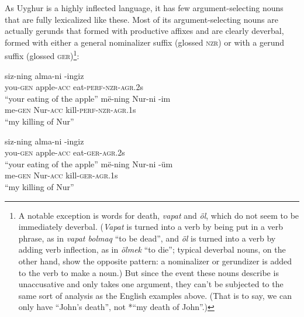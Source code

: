 \documentclass[letterpaper,12pt]{article}
\newcommand{\poss}[2]{\textsc{agr}.{\footnotesize #1}#2}
\newcommand{\gen}{\textsc{gen}}
\begin{document}
As Uyghur is a highly inflected language, it has few argument-selecting nouns that are fully lexicalized like these. Most of its argument-selecting nouns
are actually gerunds that formed with productive affixes and are clearly deverbal, formed with either a general nominalizer suffix (glossed \textsc{nzr}) or with a 
gerund suffix (glossed \textsc{ger})\footnote{A notable exception is words for death, \textsl{vapat} and \textsl{\"ol}, which do not seem to be
immediately deverbal. (\textsl{Vapat} is turned into a verb by being put in a verb phrase, as in \textsl{vapat bolmaq} ``to be dead'', and \textsl{\"ol} is turned into a
verb by adding verb inflection, as in \textsl{\"olmek} ``to die''; typical deverbal nouns, on the other hand, show the opposite pattern: a nominalizer or gerundizer is added
to the verb to make a noun.) But since the event these nouns describe is unaccusative and only takes one argument, they can't be subjected to the same sort of analysis as the
English examples above. (That is to say, we can only have ``John's death'', not *``my death of John''.)}:
\begin{exe}
\ex
	\begin{xlist}
	\ex \gll siz-ning alma-ni -ingiz\\
					 you-\gen{} apple-\textsc{acc} eat-\textsc{perf}-\textsc{nzr}-\poss{2}{s}\\
			\glt ``your eating of the apple''
	\ex \gll m\"e-ning Nur-ni -im\\
					 me-\gen{} Nur-\textsc{acc} kill-\textsc{perf}-\textsc{nzr}-\poss{1}{s}\\
			\glt ``my killing of Nur''
	\end{xlist}
\ex
	\begin{xlist}
	\ex \gll siz-ning alma-ni -ingiz\\
					 you-\gen{} apple-\textsc{acc} eat-\textsc{ger}-\poss{2}{s}\\
			\glt ``your eating of the apple''
	\ex \gll m\"e-ning Nur-ni -\"um\\
					 me-\gen{} Nur-\textsc{acc} kill-\textsc{ger}-\poss{1}{s}\\
			\glt ``my killing of Nur''
	\end{xlist}
\end{exe}
\end{document}
